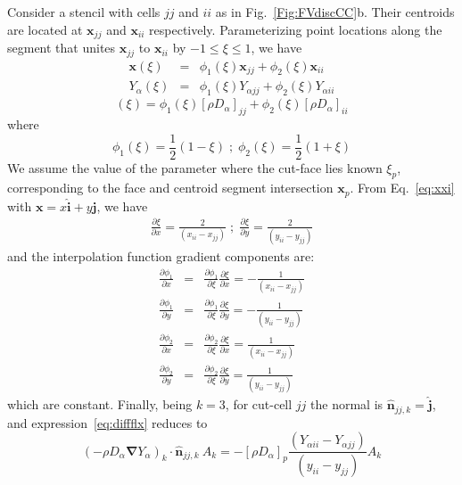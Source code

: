 Consider a stencil with cells $jj$ and $ii$ as in Fig.~\ref{Fig:FVdiscCC}b. Their centroids are located at $\mathbf{x}_{jj}$ and $\mathbf{x}_{ii}$ respectively. Parameterizing point locations along the segment that unites $\mathbf{x}_{jj}$ to $\mathbf{x}_{ii}$ by $-1 \le \xi \le 1$, we have
%
\begin{eqnarray}
   \mathbf{x}(\xi)  & = &  \phi_1(\xi) \mathbf{x}_{jj} + \phi_2(\xi) \mathbf{x}_{ii} \label{eq:xxi} \\
   Y_\alpha (\xi)  & = & \phi_1(\xi) Y_{\alpha jj} + \phi_2(\xi) Y_{\alpha ii}
\end{eqnarray}
%
\begin{equation}
[ \rho D_\alpha ] (\xi)  =  \phi_1(\xi) [ \rho D_\alpha ]_{jj} + \phi_2(\xi) [ \rho D_\alpha ]_{ii}
\end{equation}
where
%
\begin{equation}
   \phi_1(\xi) = \frac{1}{2} \left(1 - \xi \right) \; ; \; \phi_2(\xi) = \frac{1}{2} \left(1 + \xi \right)
\end{equation}
%
We assume the value of the parameter where the cut-face lies known $\xi_p$, corresponding to the face and centroid segment intersection $\mathbf{x}_p$. From Eq.~\eqref{eq:xxi} with $\mathbf{x}=x\hat{\mathbf{i}}+y\hat{\mathbf{j}}$, we have
%
\begin{eqnarray}
   \frac{\partial \xi}{\partial x} = \frac{2}{(x_{ii}-x_{jj})} \; ; \;  \frac{\partial \xi}{\partial y} = \frac{2}{(y_{ii}-y_{jj})}
\end{eqnarray}
%
and the interpolation function gradient components are:
%
\begin{eqnarray}
  \frac{\partial\phi_1}{\partial x} & = & \frac{\partial\phi_1}{\partial \xi} \frac{\partial \xi}{\partial x}=-\frac{1}{(x_{ii}-x_{jj})} \\
  \frac{\partial\phi_1}{\partial y} & = & \frac{\partial\phi_1}{\partial \xi} \frac{\partial \xi}{\partial y}=-\frac{1}{(y_{ii}-y_{jj})} \\
  \frac{\partial\phi_2}{\partial x} & = & \frac{\partial\phi_2}{\partial \xi} \frac{\partial \xi}{\partial x}= \frac{1}{(x_{ii}-x_{jj})} \\
  \frac{\partial\phi_2}{\partial y} & = & \frac{\partial\phi_2}{\partial \xi} \frac{\partial \xi}{\partial y}= \frac{1}{(y_{ii}-y_{jj})}
\end{eqnarray}
%
which are constant. Finally, being $k=3$, for cut-cell $jj$ the normal is $\hat{\mathbf{n}}_{jj,k}=\hat{\mathbf{j}}$, and expression~\eqref{eq:diffflx} reduces to
%
\begin{equation}
  \left( - \rho D_\alpha \boldsymbol{\nabla} Y_\alpha \right)_k \cdot \hat{\mathbf{n}}_{jj,k} \: A_k =
  -[ \rho D_\alpha ]_p \frac{\left(  Y_{\alpha ii} - Y_{\alpha jj} \right)}{(y_{ii}-y_{jj})}A_k
\end{equation}
